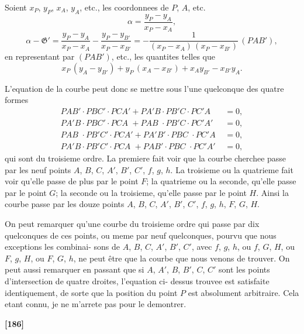 \documentclass[11pt,a4paper]{book}
\begin{document}
Soient $x_P$, $y_P$, $x_A$, $y_A$, etc., les coordonnees de $P$, $A$, etc.
\[\alpha = \frac{y_P - y_A}{x_P - x_A},\]
\[\alpha - \mathfrak{G}' = \frac{y_P - y_A}{x_P - x_A} - \frac{y_P - y_{B'}}{x_P - x_{B'}} = -\frac{1}{(x_P - x_A)\, (x_P - x_{B'})}\, (PAB'),\]
en representant par $(PAB')$, etc., les quantites telles que
\[x_P\, (y_A - y_{B'}) + y_P\, (x_A - x_{B'}) + x_A y_{B'} - x_{B'} y_A.\]

L'equation de la courbe peut donc se mettre sous l'une quelconque des quatre formes
\begin{align*}
PAB' \cdot PBC' \cdot PCA' + PA'B \cdot PB'C \cdot PC'A &= 0,\\
PA'B \cdot PBC' \cdot PCA \phantom{'} + PAB \phantom{'} \cdot PB'C \cdot PC'A' &= 0,\\
PAB \phantom{'} \cdot PB'C' \cdot PCA' + PA'B' \cdot PBC \phantom{'} \cdot PC'A \phantom{'} &= 0,\\
PA'B \cdot PB'C' \cdot PCA \phantom{'} + PAB' \cdot PBC \phantom{'} \cdot PC'A' &= 0,
\end{align*}
qui sont du troisieme ordre. La premiere fait voir que la courbe cherchee passe par les
neuf points $A$, $B$, $C$, $A'$, $B'$, $C'$, $f$, $g$, $h$. La troisieme ou la quatrieme fait voir qu'elle
passe de plus par le point $F$; la quatrieme ou la seconde, qu'elle passe par le point $G$;
la seconde ou la troisieme, qu'elle passe par le point $H$. Ainsi la courbe passe par les
douze points $A$, $B$, $C$, $A'$, $B'$, $C'$, $f$, $g$, $h$, $F$, $G$, $H$.

On peut remarquer qu'une courbe du troisieme ordre qui passe par dix quelconques
de ces points, ou meme par neuf quelconques, pourvu que nous exceptions les combinai-
sons de $A$, $B$, $C$, $A'$, $B'$, $C'$, avec $f$, $g$, $h$, ou $f$, $G$, $H$, ou $F$, $g$, $H$, ou $F$, $G$, $h$, ne peut
\^etre que la courbe que nous venons de trouver. On peut aussi remarquer en passant
que si $A$, $A'$, $B$, $B'$, $C$, $C'$ sont les points d'intersection de quatre droites, l'equation ci-
dessus trouvee est satisfaite identiquement, de sorte que la position du point $P$ est
absolument arbitraire. Cela etant connu, je ne m'arrete pas pour le demontrer.

\textbf{[186]}
\end{document}
